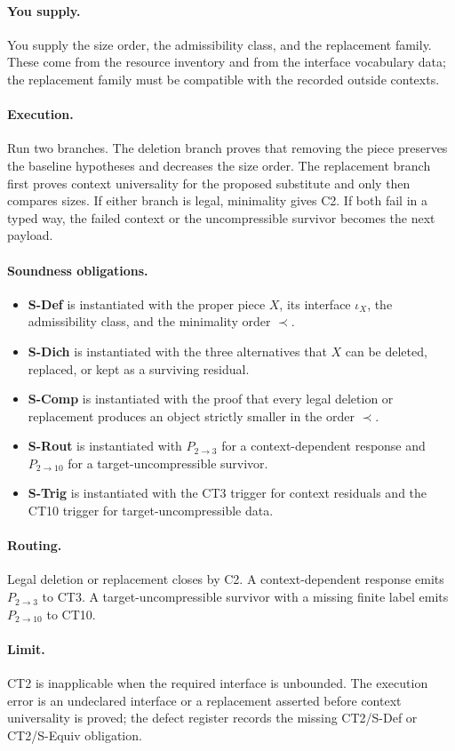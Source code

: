 \documentclass[
  11pt,
]{article}
\providecommand{\tightlist}{%
  \setlength{\itemsep}{0pt}\setlength{\parskip}{0pt}}
\theoremstyle{definition}
\newcommand{\ctpar}[1]{\paragraph{#1.}}
\begin{document}
\ctpar{You supply}
You supply the size order, the admissibility class, and the replacement
family.  These come from the resource inventory and from the interface
vocabulary data; the replacement family must be compatible with the
recorded outside contexts.

\ctpar{Execution}
Run two branches.  The deletion branch proves that removing the piece
preserves the baseline hypotheses and decreases the size order.  The
replacement branch first proves context universality for the proposed
substitute and only then compares sizes.  If either branch is legal,
minimality gives C2.  If both fail in a typed way, the failed context or
the uncompressible survivor becomes the next payload.

\ctpar{Soundness obligations}
\begin{itemize}
\tightlist
\item \textbf{S-Def} is instantiated with the proper piece \(X\), its interface \(\iota_X\), the admissibility class, and the minimality order \(\prec\).
\item \textbf{S-Dich} is instantiated with the three alternatives that \(X\) can be deleted, replaced, or kept as a surviving residual.
\item \textbf{S-Comp} is instantiated with the proof that every legal deletion or replacement produces an object strictly smaller in the order \(\prec\).
\item \textbf{S-Rout} is instantiated with \(P_{2\to3}\) for a context-dependent response and \(P_{2\to10}\) for a target-uncompressible survivor.
\item \textbf{S-Trig} is instantiated with the CT3 trigger for context residuals and the CT10 trigger for target-uncompressible data.
\end{itemize}

\ctpar{Routing}
Legal deletion or replacement closes by C2.  A context-dependent
response emits \(P_{2\to3}\) to CT3.  A target-uncompressible survivor
with a missing finite label emits \(P_{2\to10}\) to CT10.

\ctpar{Limit}
CT2 is inapplicable when the required interface is unbounded. The execution error is an
undeclared interface or a replacement asserted before context
universality is proved; the defect register records the missing CT2/S-Def
or CT2/S-Equiv obligation.
\end{document}
